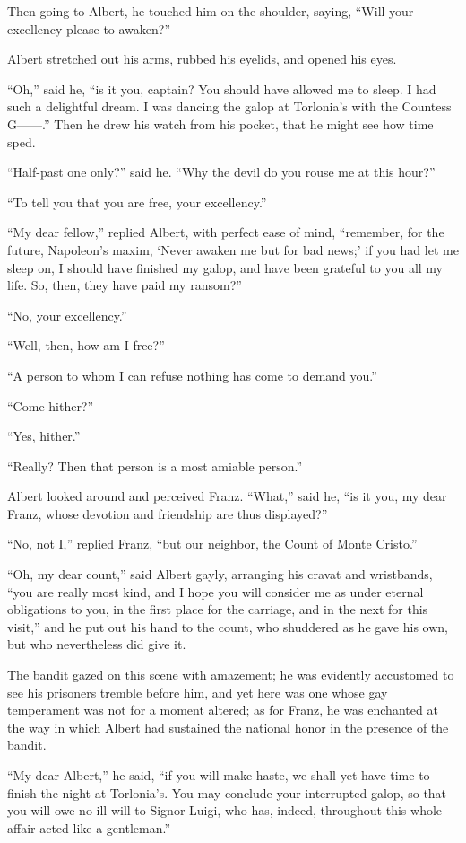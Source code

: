 Then going to Albert, he touched him on the shoulder, saying, “Will
your excellency please to awaken?”

Albert stretched out his arms, rubbed his eyelids, and opened his eyes.

“Oh,” said he, “is it you, captain? You should have allowed me to
sleep. I had such a delightful dream. I was dancing the galop at
Torlonia’s with the Countess G——.” Then he drew his watch from his
pocket, that he might see how time sped.

“Half-past one only?” said he. “Why the devil do you rouse me at this
hour?”

“To tell you that you are free, your excellency.”

“My dear fellow,” replied Albert, with perfect ease of mind, “remember,
for the future, Napoleon’s maxim, ‘Never awaken me but for bad news;’
if you had let me sleep on, I should have finished my galop, and have
been grateful to you all my life. So, then, they have paid my ransom?”

“No, your excellency.”

“Well, then, how am I free?”

“A person to whom I can refuse nothing has come to demand you.”

“Come hither?”

“Yes, hither.”

“Really? Then that person is a most amiable person.”

Albert looked around and perceived Franz. “What,” said he, “is it you,
my dear Franz, whose devotion and friendship are thus displayed?”

“No, not I,” replied Franz, “but our neighbor, the Count of Monte
Cristo.”

“Oh, my dear count,” said Albert gayly, arranging his cravat and
wristbands, “you are really most kind, and I hope you will consider me
as under eternal obligations to you, in the first place for the
carriage, and in the next for this visit,” and he put out his hand to
the count, who shuddered as he gave his own, but who nevertheless did
give it.

The bandit gazed on this scene with amazement; he was evidently
accustomed to see his prisoners tremble before him, and yet here was
one whose gay temperament was not for a moment altered; as for Franz,
he was enchanted at the way in which Albert had sustained the national
honor in the presence of the bandit.

“My dear Albert,” he said, “if you will make haste, we shall yet have
time to finish the night at Torlonia’s. You may conclude your
interrupted galop, so that you will owe no ill-will to Signor Luigi,
who has, indeed, throughout this whole affair acted like a gentleman.”

